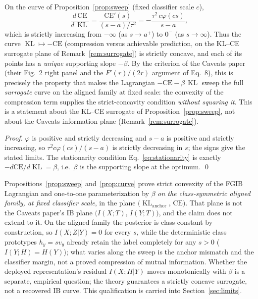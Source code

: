 \begin{proposition}\label{prop:curve}
On the curve of Proposition~\ref{prop:sweep} (fixed classifier scale $c$),
\begin{equation}
\frac{d\,\mathrm{CE}}{d\,\operatorname{KL}}
= \frac{\mathrm{CE}'(s)}{(s-a)/\tau^2}
= -\frac{\tau^2\,c\varphi(cs)}{s-a},
\label{eq:slope}
\end{equation}
which is strictly increasing from $-\infty$ (as $s \to a^+$) to $0^-$ (as $s \to
\infty$). Thus the curve $\operatorname{KL} \mapsto -\mathrm{CE}$ (compression versus
achievable prediction, on the KL--CE surrogate plane of
Remark~\ref{rem:surrogate}) is strictly concave, and each of its points has a \emph{unique}
supporting slope $-\beta$. By the criterion of the Caveats paper (their Fig.~2 right
panel and the $F'(r)/(2r)$ argument of Eq.~8), this is precisely the property that makes
the Lagrangian $-\mathrm{CE} - \beta\,\operatorname{KL}$ sweep the full \emph{surrogate}
curve on the aligned family at fixed scale: the convexity of the compression term
supplies the strict-concavity condition \emph{without squaring it}. This is a statement
about the KL--CE surrogate of Proposition~\ref{prop:sweep}, not about the Caveats
information plane (Remark~\ref{rem:surrogate}).
\end{proposition}

\begin{proof}
$\varphi$ is positive and strictly decreasing and $s-a$ is positive and strictly
increasing, so $\tau^2 c\varphi(cs)/(s-a)$ is strictly decreasing in $s$; the signs give
the stated limits. The stationarity condition Eq.~\eqref{eq:stationarity} is exactly
$-d\mathrm{CE}/d\operatorname{KL} = \beta$, i.e.\ $\beta$ is the supporting slope at the
optimum. \hfill\qed
\end{proof}

\begin{remark}\label{rem:surrogate}
Propositions~\ref{prop:sweep} and~\ref{prop:curve} prove strict convexity of the
FGIB Lagrangian and one-to-one parameterization by $\beta$ \emph{on the class-symmetric
aligned family, at fixed classifier scale}, in the plane
$\big(\operatorname{KL}_{\mathrm{anchor}},\, \mathrm{CE}\big)$. That plane is not the
Caveats paper's IB plane $\big(I(X;T),\, I(Y;T)\big)$, and the claim does not extend to
it. On the aligned family the posterior is class-constant by construction, so
$I(X;Z|Y) = 0$ for every $s$, while the deterministic class prototypes $h_y = s v_y$
already retain the label completely for any $s > 0$ ($I(Y;H) = H(Y)$); what varies
along the sweep is the anchor mismatch and the classifier margin, not a proved
compression of mutual information. Whether the deployed representation's residual
$I(X;H|Y)$ moves monotonically with $\beta$ is a separate, empirical question; the
theory guarantees a strictly concave surrogate, not a recovered IB curve. This
qualification is carried into Section~\ref{sec:limits}.
\end{remark}

